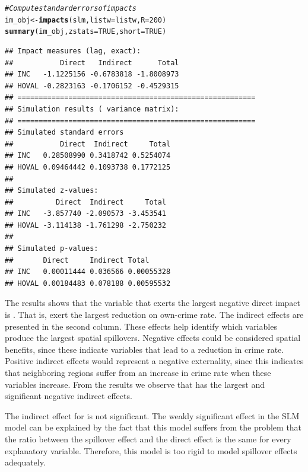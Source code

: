 \documentclass[english,12pt]{book}\usepackage[]{graphicx}\usepackage[]{xcolor}
\makeatletter
\newcommand{\hlnum}[1]{\textcolor[rgb]{0.686,0.059,0.569}{#1}}%
\newcommand{\hlcom}[1]{\textcolor[rgb]{0.678,0.584,0.686}{\textit{#1}}}%
\newcommand{\hlstd}[1]{\textcolor[rgb]{0.345,0.345,0.345}{#1}}%
\newcommand{\hlkwb}[1]{\textcolor[rgb]{0.69,0.353,0.396}{#1}}%
\newcommand{\hlkwc}[1]{\textcolor[rgb]{0.333,0.667,0.333}{#1}}%
\newcommand{\hlkwd}[1]{\textcolor[rgb]{0.737,0.353,0.396}{\textbf{#1}}}%
\newenvironment{kframe}{%
 \def\at@end@of@kframe{}%
 \ifinner\ifhmode%
  \def\at@end@of@kframe{\end{minipage}}%
  \begin{minipage}{\columnwidth}%
 \fi\fi%
 \def\FrameCommand##1{\hskip\@totalleftmargin \hskip-\fboxsep
 \colorbox{shadecolor}{##1}\hskip-\fboxsep
     \hskip-\linewidth \hskip-\@totalleftmargin \hskip\columnwidth}%
 \MakeFramed {\advance\hsize-\width
   \@totalleftmargin\z@ \linewidth\hsize
   \@setminipage}}%
 {\par\unskip\endMakeFramed%
 \at@end@of@kframe}
\newenvironment{knitrout}{}{} %
\makeatother
\begin{document}
\begin{knitrout}
\color{fgcolor}\begin{kframe}
\begin{alltt}
\hlcom{# Compute standard errors of impacts}
\hlstd{im_obj} \hlkwb{<-} \hlkwd{impacts}\hlstd{(slm,} \hlkwc{listw} \hlstd{= listw,} \hlkwc{R} \hlstd{=} \hlnum{200}\hlstd{)}
\hlkwd{summary}\hlstd{(im_obj,} \hlkwc{zstats} \hlstd{=} \hlnum{TRUE}\hlstd{,} \hlkwc{short} \hlstd{=} \hlnum{TRUE}\hlstd{)}
\end{alltt}
\begin{verbatim}
## Impact measures (lag, exact):
##           Direct   Indirect      Total
## INC   -1.1225156 -0.6783818 -1.8008973
## HOVAL -0.2823163 -0.1706152 -0.4529315
## ========================================================
## Simulation results ( variance matrix):
## ========================================================
## Simulated standard errors
##           Direct  Indirect     Total
## INC   0.28508990 0.3418742 0.5254074
## HOVAL 0.09464442 0.1093738 0.1772125
## 
## Simulated z-values:
##          Direct  Indirect     Total
## INC   -3.857740 -2.090573 -3.453541
## HOVAL -3.114138 -1.761298 -2.750232
## 
## Simulated p-values:
##       Direct     Indirect Total     
## INC   0.00011444 0.036566 0.00055328
## HOVAL 0.00184483 0.078188 0.00595532
\end{verbatim}
\end{kframe}
\end{knitrout}

The results shows that the variable that exerts the largest negative direct impact is . That is,  exert the largest reduction on own-crime rate. The indirect effects are presented in the second column. These effects help identify which variables produce the largest spatial spillovers. Negative effects could be considered spatial benefits, since these indicate variables that lead to a reduction in crime rate. Positive indirect effects would represent a negative externality, since this indicates that neighboring regions suffer from an increase in crime rate when these variables increase. From the results we observe that  has the largest and significant negative indirect effects. 

The indirect effect for  is not significant. The weakly significant effect in the SLM model can be explained by the fact that this model suffers from the problem that the ratio between the spillover effect and the direct effect is the same for every explanatory variable. Therefore, this model is too rigid to model spillover effects adequately. 
\end{document}
